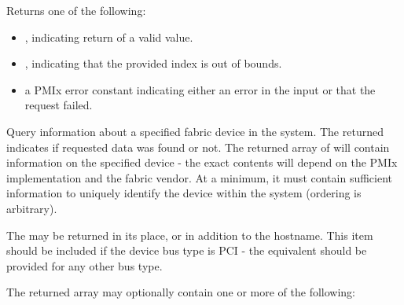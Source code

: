 \begin{arglist}
\end{arglist}

Returns one of the following:

\begin{itemize}
    \item {}, indicating return of a valid value.
    \item {}, indicating that the provided index is out of bounds.
    \item a \ac{PMIx} error constant indicating either an error in the input or that the request failed.
\end{itemize}

\descr

Query information about a specified fabric device in the system. The returned  indicates if requested data was found or not. The returned array of  will contain information on the specified device - the exact contents will depend on the \ac{PMIx} implementation and the fabric vendor. At a minimum, it must contain sufficient information to uniquely identify the device within the system (ordering is arbitrary).

\reqattrstart
{} The  may be returned in its place, or in addition to the hostname.
\pasteAttributeItemEnd
{}
 This item should be included if the device bus type is \ac{PCI} - the equivalent should be provided for any other bus type.
\pasteAttributeItemEnd

\reqattrend

The returned array may optionally contain one or more of the following:

\optattrstart
{}
\optattrend

